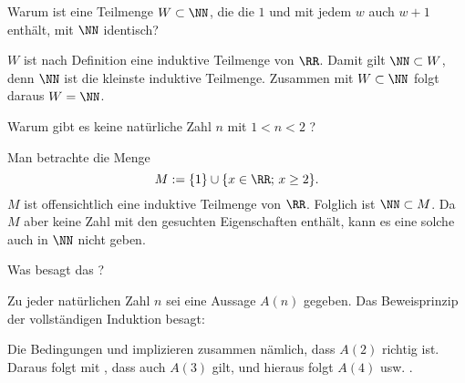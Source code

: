 \begin{frage}
  Warum ist eine Teilmenge $W\subset \NN$, die die 
  $1$ und mit jedem $w$ auch $w+1$ enthält,  
  mit $\NN$ identisch?
\end{frage}

\begin{antwort}
  $W$ ist nach Definition eine induktive Teilmenge von $\RR$. 
  Damit gilt $
  \NN\subset W$, 
  denn $\NN$ ist die kleinste induktive Teilmenge. 
  Zusammen mit $
  W\subset\NN$ 
  folgt daraus $W=\NN$.
  \AntEnd
\end{antwort}

\begin{frage} 
  \label{dazwischen}
  Warum gibt es keine natürliche Zahl $n$ mit $1 < n< 2 $ ?
\end{frage}

\begin{antwort}
  Man betrachte die Menge 
  \[
  M : = \{1\} \cup \{ x\in \RR; \, x \ge 2 \}.
  \]
  $M$ ist offensichtlich eine induktive Teilmenge von $\RR$. 
  Folglich ist $\NN \subset M$. 
  Da $M$ aber keine Zahl mit den gesuchten Eigenschaften 
  enthält, kann es eine solche auch in $\NN$ nicht geben.
  \AntEnd
\end{antwort}


\begin{frage} 
  Was besagt das ?
\end{frage}

\begin{antwort}
  Zu jeder natürlichen Zahl $n$ sei eine Aussage $A(n)$ gegeben. 
  Das Beweisprinzip der vollständigen Induktion besagt: 

  \medskip\noindent
  \noindent
  Die Bedingungen  und  implizieren zusammen nämlich, 
  dass $A(2)$ richtig ist. Daraus folgt mit , dass 
  auch $A(3)$ gilt, und hieraus folgt $A(4)$ usw. . 
  \AntEnd
\end{antwort}



